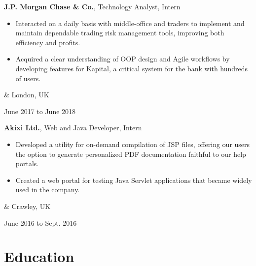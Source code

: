 \documentclass[10pt, letterpaper]{article}
\newenvironment{highlights}{
        \begin{itemize}[
                topsep=0pt,
                parsep=0.10 cm,
                partopsep=0pt,
                itemsep=0pt,
                after=\vspace{-1\baselineskip},
                leftmargin=0.4 cm + 3pt
            ]
    }{
        \end{itemize}
    } %
\let\originalTabularx\tabularx
\let\originalEndTabularx\endtabularx
\renewenvironment{tabularx}{\bgroup\centering\originalTabularx}{\originalEndTabularx\par\egroup}
\begin{document}
        \vspace{0.2 cm}
        \begin{tabularx}{
            \textwidth-0.2 cm-0.13cm
        }{
            K{0.1 cm}
            R{4.1 cm}
        }
            \textbf{J.P. Morgan Chase \& Co.}, Technology Analyst, Intern

            \vspace{0.10 cm}

            \begin{highlights}
                \item Interacted on a daily basis with middle-office and traders to implement and maintain dependable trading risk management tools, improving both efficiency and profits.
                \item Acquired a clear understanding of OOP design and Agile workflows by developing features for Kapital, a critical system for the bank with hundreds of users.
            \end{highlights}
            &
            London, UK

            June 2017 to June 2018
        \end{tabularx}

        \vspace{0.2 cm}
        \begin{tabularx}{
            \textwidth-0.2 cm-0.13cm
        }{
            K{0.1 cm}
            R{4.1 cm}
        }
            \textbf{Akixi Ltd.}, Web and Java Developer, Intern

            \vspace{0.10 cm}

            \begin{highlights}
                \item Developed a utility for on-demand compilation of JSP files, offering our users the option to generate personalized PDF documentation faithful to our help portals.
                \item Created a web portal for testing Java Servlet applications that became widely used in the company.
            \end{highlights}
            &
            Crawley, UK

            June 2016 to Sept. 2016
        \end{tabularx}


    
    \section{Education}
\end{document}
